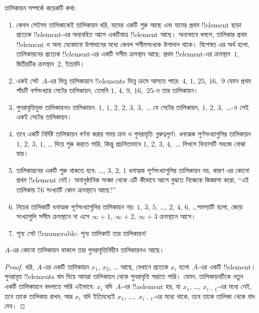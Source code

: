 \documentclass[../../../include/open-logic-section]{subfiles}
\begin{document}
\begin{explain}
তালিকায়ন সম্পর্কে কয়েকটি কথা:
\begin{enumerate}
\item কেবল সেইসব তালিকাকেই তালিকায়ন ধরি, যাদের একটি শুরু আছে এবং যাদের প্রথম !!{element} ছাড়া প্রত্যেক !!{element}-এর অব্যবহিত আগে একটিমাত্র !!{element} আছে। অন্যভাবে বললে, তালিকার প্রথম !!{element} ও অন্য যেকোনো উপাদানের মধ্যে কেবল সসীমসংখ্যক উপাদান থাকে। বিশেষত এর অর্থ হলো, তালিকায়নের প্রত্যেক !!{element}-এর একটি সসীম ক্রমস্থান আছে: প্রথম !!{element}-এর ক্রমস্থান~$1$, দ্বিতীয়টির ক্রমস্থান~$2$, ইত্যাদি।
\item একই সেট~$A$-এর ভিন্ন তালিকায়নে !!{element}s ভিন্ন ক্রমে আসতে পারে: $4$, $1$, $25$, $16$,~$9$ যেমন প্রথম পাঁচটি বর্গসংখ্যার সেটের তালিকায়ন, তেমনি $1$, $4$, $9$, $16$,~$25$-ও তার তালিকায়ন।
\item পুনরাবৃত্তিযুক্ত তালিকায়নও তালিকায়ন: $1$, $1$, $2$, $2$, $3$, $3$,~\dots{} যে সেটের তালিকায়ন, $1$, $2$, $3$,~\dots{}-ও সেই একই সেটের তালিকায়ন।
\item তবে একটি নির্দিষ্ট তালিকায়ন বর্ণনা করার সময় ক্রম ও পুনরাবৃত্তি \emph{গুরুত্বপূর্ণ}। ধনাত্মক পূর্ণসংখ্যাগুলির তালিকায়ন $1$, $2$, $3$, $1$, \dots{} দিয়ে শুরু করতে পারি, কিন্তু প্রচলিতভাবে $1$, $2$, $3$, $4$,~\dots{} লিখলে বিন্যাসটি সহজে বোঝা যায়।
\item তালিকায়নের একটি শুরু থাকতে হবে: \dots, $3$, $2$, $1$ ধনাত্মক পূর্ণসংখ্যাগুলির তালিকায়ন নয়, কারণ এর কোনো প্রথম !!{element} নেই। অনানুষ্ঠানিক সংজ্ঞা থেকে এটি কীভাবে আসে বুঝতে নিজেকে জিজ্ঞাসা করো, ``এই তালিকায় 76 সংখ্যাটি কোন ক্রমস্থানে আছে?''
\item নিচের তালিকাটি ধনাত্মক পূর্ণসংখ্যাগুলির তালিকায়ন নয়: $1$, $3$, $5$, \dots, $2$, $4$, $6$, \dots\@ সমস্যাটি হলো, জোড় সংখ্যাগুলি সসীম ক্রমস্থানে না এসে $\infty + 1$, $\infty + 2$, $\infty +
  3$ ক্রমস্থানে আসে।
\item শূন্য সেট !!{enumerable}: শূন্য তালিকাই তার তালিকায়ন!{}
\end{enumerate}
\end{explain}

\begin{prop}
  $A$-এর কোনো তালিকায়ন থাকলে তার পুনরাবৃত্তিবিহীন তালিকায়নও আছে।
\end{prop}

\begin{proof}
  ধরি, $A$-এর একটি তালিকায়ন $x_1$, $x_2$, \dots{} আছে, যেখানে প্রত্যেক $x_i$ হলো~$A$-এর একটি !!{element}। পুনরাবৃত্ত !!{element}s বাদ দিয়ে আমরা তালিকায়ন থেকে পুনরাবৃত্তি সরাতে পারি। যেমন, তালিকায়নটিকে নতুন একটি তালিকায়নে বদলাতে পারি এইভাবে: $x_i$ যদি~$A$-এর !!a{element} হয়, যা $x_1$, \dots, $x_{i-1}$-এর মধ্যে নেই, তবে তাকে তালিকায় রাখব; আর $x_i$ যদি ইতিমধ্যেই $x_1$, \dots,~$x_{i-1}$-এর মধ্যে থাকে, তবে তাকে তালিকা থেকে বাদ দেব।
\end{proof}
\end{document}
